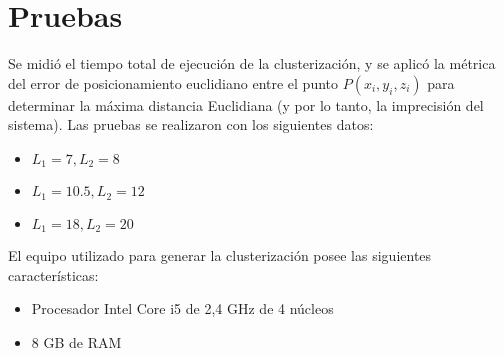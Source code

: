 \section{Pruebas}

Se midió el tiempo total de ejecución de la clusterización, y se aplicó la métrica del error de posicionamiento euclidiano entre el punto $P(x_i, y_i, z_i)$ para determinar la máxima distancia Euclidiana (y por lo tanto, la imprecisión del sistema). Las pruebas se realizaron con los siguientes datos:

\begin{itemize}
	\item $L_1 = 7, L_2 = 8$
	\item $L_1 = 10.5, L_2 = 12$
	\item $L_1 = 18, L_2 = 20$
\end{itemize}

El equipo utilizado para generar la clusterización posee las siguientes características:

\begin{itemize}
	\item Procesador Intel Core i5 de 2,4 GHz de 4 núcleos
	\item 8 GB de RAM
\end{itemize}

